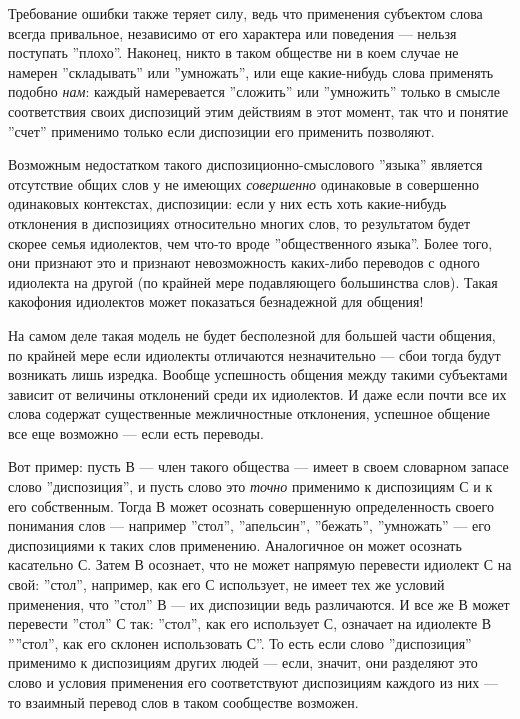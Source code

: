 \documentclass[11pt]{book}
\begin{document}
Требование ошибки также теряет силу, ведь что применения субъектом слова всегда привальное, независимо от его характера или поведения --- нельзя поступать ''плохо''. Наконец, никто в таком обществе ни в коем случае не намерен ''складывать'' или ''умножать'', или еще какие-нибудь слова применять подобно \textit{нам}: каждый намеревается ''сложить'' или ''умножить'' только в смысле соответствия своих диспозиций этим действиям в этот момент, так что и понятие ''счет'' применимо только если диспозиции его применить позволяют.

Возможным недостатком такого диспозиционно-смыслового ''языка'' является отсутствие общих слов у не имеющих \textit{совершенно} одинаковые в совершенно одинаковых контекстах, диспозиции: если у них есть хоть какие-нибудь отклонения в диспозициях относительно многих слов, то результатом будет скорее семья идиолектов, чем что-то вроде ''общественного языка''. Более того, они признают это и признают невозможность каких-либо переводов с одного идиолекта на другой (по крайней мере подавляющего большинства слов). Такая какофония идиолектов может показаться безнадежной для общения!

На самом деле такая модель не будет бесполезной для большей части общения, по крайней мере если идиолекты отличаются незначительно --- сбои тогда будут возникать лишь изредка. Вообще успешность общения между такими субъектами зависит от величины отклонений среди их идиолектов. И даже если почти все их слова содержат существенные межличностные отклонения, успешное общение все еще возможно --- если есть переводы.

Вот пример: пусть В --- член такого общества --- имеет в своем словарном запасе слово ''диспозиция'', и пусть слово это \textit{точно} применимо к диспозициям С и к его собственным. Тогда В может осознать совершенную определенность своего понимания слов --- например ''стол'', ''апельсин'', ''бежать'', ''умножать'' --- его диспозициями к таких слов применению. Аналогичное он может осознать касательно С. Затем В осознает, что не может напрямую перевести идиолект С на свой: ''стол'', например, как его С использует, не имеет тех же условий применения, что ''стол'' В --- их диспозиции ведь различаются. И все же В может перевести ''стол'' С так: ''стол'', как его использует С, означает на идиолекте В ''''стол'', как его склонен использовать С''. То есть если слово ''диспозиция'' применимо к диспозициям других людей --- если, значит, они разделяют это слово и условия применения его соответствуют диспозициям каждого из них --- то взаимный перевод слов в таком сообществе возможен.
\end{document}
